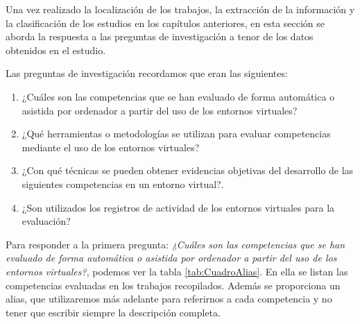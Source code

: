 Una vez realizado la localización de los trabajos, la extracción de la información y la clasificación de los estudios en los capítulos anteriores, en esta sección se aborda la respuesta a las preguntas de investigación a tenor de los datos obtenidos en el estudio.



Las preguntas de investigación recordamos que eran las siguientes:
\begin{enumerate}
\item ¿Cuáles son las competencias que se han evaluado de forma automática o asistida por ordenador a partir del uso de los entornos virtuales?
\item ¿Qué herramientas o metodologías se utilizan para evaluar competencias mediante el uso de los entornos virtuales?
\item ¿Con qué técnicas se pueden obtener evidencias objetivas del desarrollo de las siguientes competencias en un entorno virtual?.
\item ¿Son utilizados los registros de actividad de los entornos virtuales para la evaluación?
\end{enumerate}

Para responder a la primera pregunta: \emph{¿Cuáles son las competencias que se han evaluado de forma automática o asistida por ordenador a partir del uso de los entornos virtuales?}, podemos ver la tabla \ref{tab:CuadroAlias}. En ella se listan las competencias evaluadas en los trabajos recopilados. Además se proporciona un alias, que utilizaremos más adelante para referirnos a cada competencia y no tener que escribir siempre la descripción completa.


